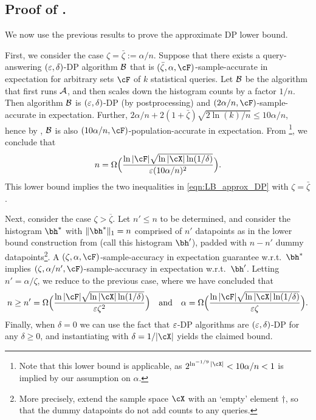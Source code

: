 \subsection{Proof of .}

\label{sec:pf_approx_DP_LB}

We now use the previous results to prove the approximate DP lower bound.

\begin{proofof}{}
First, we consider the case $\zeta=\bar\zeta:=\alpha/n$. Suppose that there exists a query-answering  $(\varepsilon,\delta)$-DP algorithm ${\cal B}$ that is $(\bar\zeta,\alpha,\cF)$-sample-accurate in expectation for arbitrary sets $\cF$ of $k$ statistical queries. 
Let ${\cal B}$ be the algorithm that first runs ${\cal A}$, and then scales down the histogram counts by a factor $1/n$. Then algorithm ${\cal B}$ is $(\varepsilon,\delta)$-DP (by postprocessing) and $(2\alpha/n,\cF)$-sample-accurate in expectation. Further, $2\alpha/n+2(1+\bar\zeta)\sqrt{2\ln(k)/n}\leq 10\alpha/n$, hence by , ${\cal B}$ is also $(10\alpha/n,\cF)$-population-accurate in expectation.  
From \footnote{Note that this lower bound is applicable, as $2^{\ln^{-1/9}|{\cX}|}<10\alpha/n<1$ is implied by our assumption on $\alpha$.}, we conclude that 
\[ n=\Omega\Big(\frac{\ln|{\cF}|\sqrt{\ln|{\cX}| \ln(1/\delta)}}{\eps (10\alpha/n)^2} \Big).\]
This lower bound implies the two inequalities in \eqref{eqn:LB_approx_DP} with $\zeta=\bar\zeta$.

Next, consider the case $\zeta > \overline\zeta$.  Let $n'\leq n$ to be determined, and consider the histogram $\bh^{\ast}$ with $\|\bh^{\ast}\|_1=n$ comprised of $n'$ datapoints as in the lower bound construction from  
\cite{Lyu:2024} (call this histogram $\bh'$), padded with $n-n'$ dummy datapoints\footnote{More precisely, extend the sample space ${\cX}$ with an `empty' element $\dagger$, so that the dummy datapoints do not add counts to any queries.}. A $(\zeta,\alpha,\cF)$-sample-accuracy in expectation guarantee w.r.t.~$\bh^{\ast}$ implies $(\zeta,\alpha/n',\cF)$-sample-accuracy in expectation w.r.t.~$\bh'$. Letting $n'=\alpha/\zeta$, we reduce to the previous case, where we have concluded that
\begin{align*}
n \geq n'=\Omega\Big( \frac{\ln|{\cF}|\sqrt{\ln|{\cX}| \ln(1/\delta)}}{\eps \zeta^2}  \Big) \quad \mbox{and}\quad
\alpha = \Omega\Big( \frac{\ln|{\cF}|\sqrt{\ln|{\cX}| \ln(1/\delta)}}{\eps \zeta}  \Big). 
\end{align*}
Finally, when $\delta=0$ we can use the fact that $\varepsilon$-DP algorithms are $(\varepsilon,\delta)$-DP for any $\delta\geq 0$, and instantiating  with $\delta=1/|\cX|$ yields the claimed bound.
\end{proofof}